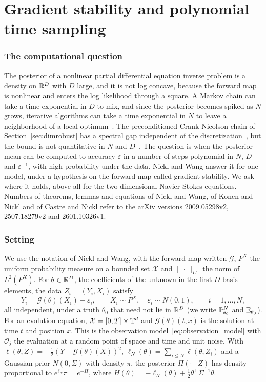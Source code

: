 \section{Gradient stability and polynomial time sampling}
\label{sec:gradstab}

\subsubsection{The computational question} The posterior of a nonlinear partial differential equation inverse problem is a density on $\R^D$ with $D$ large, and it is not log concave, because the forward map is nonlinear and enters the log likelihood through a square. A Markov chain can take a time exponential in $D$ to mix, and since the posterior becomes spiked as $N$ grows, iterative algorithms can take a time exponential in $N$ to leave a neighborhood of a local optimum~\cite{nicklwang2024}. The preconditioned Crank Nicolson chain of Section~\ref{sec:dimrobust} has a spectral gap independent of the discretization~\cite{hairer2014}, but the bound is not quantitative in $N$ and $D$~\cite{nicklwang2024}. The question is when the posterior mean can be computed to accuracy $\varepsilon$ in a number of steps polynomial in $N$, $D$ and $\varepsilon^{-1}$, with high probability under the data. Nickl and Wang answer it for one model, under a hypothesis on the forward map called gradient stability. We ask where it holds, above all for the two dimensional Navier Stokes equations. Numbers of theorems, lemmas and equations of Nickl and Wang, of Konen and Nickl and of Castre and Nickl refer to the arXiv versions 2009.05298v2, 2507.18279v2 and 2601.10326v1.

\subsubsection{Setting} We use the notation of Nickl and Wang, with the forward map written $\mathcal{G}$, $P^X$ the uniform probability measure on a bounded set $\mathcal{X}$ and $\|\cdot\|_{L^2}$ the norm of $L^2(P^X)$. For $\theta\in\R^D$, the coefficients of the unknown in the first $D$ basis elements, the data $Z_i=(Y_i,X_i)$ satisfy
\begin{equation}\label{eq:gs_model}
Y_i=\mathcal{G}(\theta)(X_i)+\varepsilon_i,\qquad X_i\sim P^X,\quad\varepsilon_i\sim N(0,1),\qquad i=1,\dots,N,
\end{equation}
all independent, under a truth $\theta_0$ that need not lie in $\R^D$ (we write $\P_{\theta_0}^N$ and $\E_{\theta_0}$). For an evolution equation, $\mathcal{X}=[0,T]\times\T^d$ and $\mathcal{G}(\theta)(t,x)$ is the solution at time $t$ and position $x$. This is the observation model~\eqref{eq:observation_model} with $\mathcal{O}_j$ the evaluation at a random point of space and time and unit noise. With $\ell(\theta,Z)=-\frac12(Y-\mathcal{G}(\theta)(X))^2$, $\ell_N(\theta)=\sum_{i\le N}\ell(\theta,Z_i)$ and a Gaussian prior $N(0,\Sigma)$ with density $\pi$, the posterior $\Pi(\cdot\mid Z)$ has density proportional to $e^{\ell_N}\pi=e^{-H}$, where $H(\theta)=-\ell_N(\theta)+\frac12\theta^\top\Sigma^{-1}\theta$.

